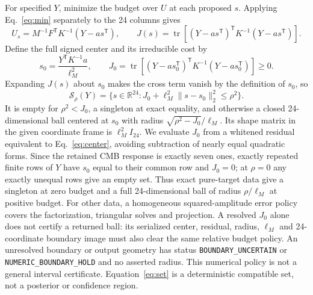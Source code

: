 \documentclass[aps,prd,onecolumn,11pt,nofootinbib,notitlepage]{revtex4-2}
\begin{document}
For specified $Y$, minimize the budget over $U$ at each proposed $s$. Applying Eq.~\eqref{eq:min} separately to the 24 columns gives
\begin{equation}
 U_s=M^{-1}F^{\mathsf T}K^{-1}(Y-a s^{\mathsf T}),\qquad
 J(s)=\operatorname{tr}\left[(Y-a s^{\mathsf T})^{\mathsf T}K^{-1}(Y-a s^{\mathsf T})\right].
 \label{eq:conditional}
\end{equation}
Define the full signed center and its irreducible cost by
\begin{equation}
 s_0=\frac{Y^{\mathsf T}K^{-1}a}{\ell_M^2},\qquad
 J_0=\operatorname{tr}\left[(Y-a s_0^{\mathsf T})^{\mathsf T}K^{-1}(Y-a s_0^{\mathsf T})\right]\ge0.
 \label{eq:center}
\end{equation}
Expanding $J(s)$ about $s_0$ makes the cross term vanish by the definition of $s_0$, so
\begin{equation}
 \boxed{\mathcal S_\rho(Y)=\{s\in\mathbb R^{24}:J_0+\ell_M^2\|s-s_0\|_2^2\le\rho^2\}.}
 \label{eq:set}
\end{equation}
It is empty for $\rho^2<J_0$, a singleton at exact equality, and otherwise a closed 24-dimensional ball centered at $s_0$ with radius $\sqrt{\rho^2-J_0}/\ell_M$. Its shape matrix in the given coordinate frame is $\ell_M^2 I_{24}$. We evaluate $J_0$ from a whitened residual equivalent to Eq.~\eqref{eq:center}, avoiding subtraction of nearly equal quadratic forms. Since the retained CMB response is exactly seven ones, exactly repeated finite rows of $Y$ have $s_0$ equal to their common row and $J_0=0$; at $\rho=0$ any exactly unequal rows give an empty set. Thus exact pure-target data give a singleton at zero budget and a full 24-dimensional ball of radius $\rho/\ell_M$ at positive budget. For other data, a homogeneous squared-amplitude error policy covers the factorization, triangular solves and projection. A resolved $J_0$ alone does not certify a returned ball: its serialized center, residual, radius, $\ell_M$ and 24-coordinate boundary image must also clear the same relative budget policy. An unresolved boundary or output geometry has status \texttt{BOUNDARY\_UNCERTAIN} or \texttt{NUMERIC\_BOUNDARY\_HOLD} and no asserted radius. This numerical policy is not a general interval certificate. Equation~\eqref{eq:set} is a deterministic compatible set, not a posterior or confidence region.
\end{document}
